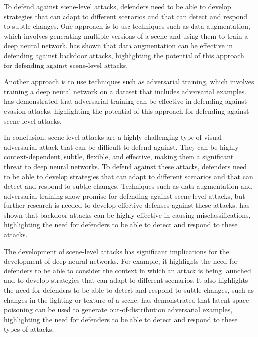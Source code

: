\documentclass[11pt]{article}
\begin{document}
To defend against scene-level attacks, defenders need to be able to develop strategies that can adapt to different scenarios and that can detect and respond to subtle changes. One approach is to use techniques such as data augmentation, which involves generating multiple versions of a scene and using them to train a deep neural network. \cite{ref81} has shown that data augmentation can be effective in defending against backdoor attacks, highlighting the potential of this approach for defending against scene-level attacks.

Another approach is to use techniques such as adversarial training, which involves training a deep neural network on a dataset that includes adversarial examples. \cite{ref82} has demonstrated that adversarial training can be effective in defending against evasion attacks, highlighting the potential of this approach for defending against scene-level attacks.

In conclusion, scene-level attacks are a highly challenging type of visual adversarial attack that can be difficult to defend against. They can be highly context-dependent, subtle, flexible, and effective, making them a significant threat to deep neural networks. To defend against these attacks, defenders need to be able to develop strategies that can adapt to different scenarios and that can detect and respond to subtle changes. Techniques such as data augmentation and adversarial training show promise for defending against scene-level attacks, but further research is needed to develop effective defenses against these attacks. \cite{ref67} has shown that backdoor attacks can be highly effective in causing misclassifications, highlighting the need for defenders to be able to detect and respond to these attacks.

The development of scene-level attacks has significant implications for the development of deep neural networks. For example, it highlights the need for defenders to be able to consider the context in which an attack is being launched and to develop strategies that can adapt to different scenarios. It also highlights the need for defenders to be able to detect and respond to subtle changes, such as changes in the lighting or texture of a scene. \cite{ref83} has demonstrated that latent space poisoning can be used to generate out-of-distribution adversarial examples, highlighting the need for defenders to be able to detect and respond to these types of attacks.
\end{document}
